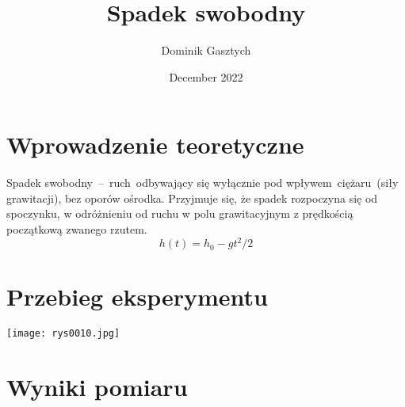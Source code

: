 \documentclass{article}
\title{Spadek swobodny}
\author{Dominik Gasztych}
\date{December 2022}
\begin{document}
\maketitle

\section{Wprowadzenie teoretyczne}
Spadek swobodny – ruch odbywający się wyłącznie pod
wpływem ciężaru (siły grawitacji), bez oporów ośrodka. Przyjmuje się, że spadek
rozpoczyna się od spoczynku, w odróżnieniu od ruchu w polu grawitacyjnym z
prędkością początkową zwanego rzutem.
\begin{equation}
    h(t)=h_0- gt^2/2
\end{equation}

\section{Przebieg eksperymentu}

\begin{center}
\texttt{[image: rys0010.jpg]}
\end{center}

\section{Wyniki pomiaru}
\end{document}
